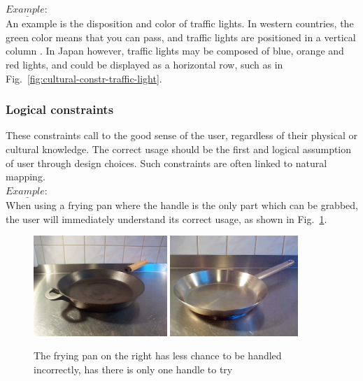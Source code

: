 \documentclass[a4paper,11pt] {article}
\theoremstyle{definition}
\begin{document}
        $\underline{Example:}$\\
        An example is the disposition and color of traffic lights. In western countries, the green color means that you can pass, and traffic lights are positioned in a vertical column . In Japan however, traffic lights may be composed of blue, orange and red lights, and could be displayed as a horizontal row, such as in Fig.~\ref{fig:cultural-constr-traffic-light}.

        \subsubsection{Logical constraints}
        These constraints call to the good sense of the user, regardless of their physical or cultural knowledge. The correct usage should be the first and logical assumption of user through design choices. Such constraints are often linked to natural mapping.\\

        $\underline{Example:}$\\
        When using a frying pan where the handle is the only part which can be grabbed, the user will immediately understand its correct usage, as shown in Fig.~\ref{fig:log-constr-fryingpan}.

        \begin{figure}[h]
        \centering
        \includegraphics[width=0.45\textwidth]{fig-report/frying-pan-2handles.jpg}
        \includegraphics[width=0.43\textwidth]{fig-report/frying-pan-1handle.jpg}
        \caption{The frying pan on the right has less chance to be handled incorrectly, has there is only one handle to try}
        \label{fig:log-constr-fryingpan}
        \end{figure}
\end{document}
